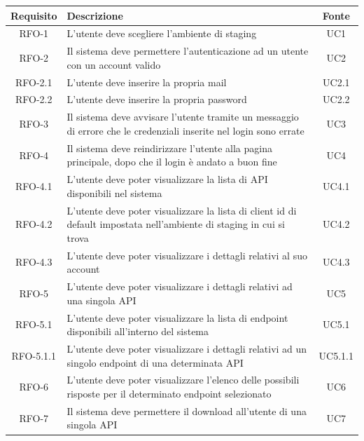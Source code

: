 
\begin{center}
\label{tab:requisiti-funzionali}
\begin{longtable}{|c|p{}|c|}
\hline
\textbf{Requisito} & \textbf{Descrizione} & \textbf{Fonte}\\
\hline
RFO-1 &L'utente deve scegliere l'ambiente di staging & UC1 \\
\hline
RFO-2 &Il sistema deve permettere l'autenticazione ad un utente con un account valido & UC2 \\
\hline
RFO-2.1 & L'utente deve inserire la propria mail & UC2.1 \\
\hline
RFO-2.2 & L'utente deve inserire la propria password & UC2.2 \\
\hline
RFO-3 &Il sistema deve avvisare l'utente tramite un messaggio di errore che le credenziali inserite nel login sono errate & UC3 \\
\hline
RFO-4 &Il sistema deve reindirizzare l'utente alla pagina principale, dopo che il login è andato a buon fine & UC4 \\
\hline
RFO-4.1 &L'utente deve poter visualizzare la lista di API disponibili nel sistema & UC4.1 \\
\hline
RFO-4.2 &L'utente deve poter visualizzare la lista di client id di default impostata nell'ambiente di staging in cui si trova & UC4.2 \\
\hline
RFO-4.3 &L'utente deve poter visualizzare i dettagli relativi al suo account & UC4.3 \\
\hline
RFO-5 &L'utente deve poter visualizzare i dettagli relativi ad una singola API  & UC5 \\
\hline
RFO-5.1 &L'utente deve poter visualizzare la lista di endpoint disponibili all'interno del sistema & UC5.1 \\
\hline
RFO-5.1.1 &L'utente deve poter visualizzare i dettagli relativi ad un singolo endpoint di una determinata API & UC5.1.1 \\
\hline
RFO-6 &L'utente deve poter visualizzare l'elenco delle possibili risposte per il determinato endpoint selezionato & UC6 \\
\hline
RFO-7 &Il sistema deve permettere il download all'utente di una singola API & UC7 \\

\end{longtable}
\end{center}
